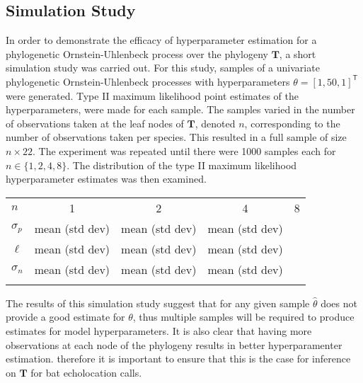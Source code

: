 \documentclass[wsdraft]{ws-rv9x6} %
\begin{document}
\subsection{Simulation Study}

In order to demonstrate the efficacy of hyperparameter estimation for a phylogenetic Ornstein-Uhlenbeck process over the phylogeny \(\mathbf{T}\), a short simulation study was carried out. For this study, samples of a univariate phylogenetic Ornstein-Uhlenbeck processes with hyperparameters \(\theta= [1,50,1]^{\mathsf{T}}\) were generated. Type II maximum likelihood point estimates of the hyperparameters, were made for each sample. The samples varied in the number of observations taken at the leaf nodes of \(\mathbf{T}\), denoted \(n\), corresponding to the number of observations taken per species. This resulted in a full sample of size \(n \times 22\). The experiment was repeated until there were 1000 samples each for \(n \in \{1,2,4,8\}\). The distribution of the type II maximum likelihood hyperparameter estimates was then examined.

\begin{table}[ht]
	{
		\begin{tabular}{@{}lcccc@{}} \toprule
			\(n\) & 1 & 2 & 4 & 8  \\ 
			\colrule
			\(\sigma_p \)  & mean (std dev) & mean (std dev) & mean (std dev)  \\
			\(\ell\)  & mean (std dev) & mean (std dev) & mean (std dev)  \\
			\(\sigma_n\)  & mean (std dev) & mean (std dev) & mean (std dev)  \\

			\botrule
		\end{tabular}
	}
	\label{tab::simulation}
\end{table}

The results of this simulation study suggest that for any given sample \(\hat{\theta}\) does not provide a good estimate for \(\theta\), thus multiple samples will be required to produce estimates for model hyperparameters. It is also clear that having more observations at each node of the phylogeny results in better hyperparamenter estimation. therefore it is important to ensure that this is the case for inference on \(\mathbf{T}\) for bat echolocation calls.  





\end{document}
